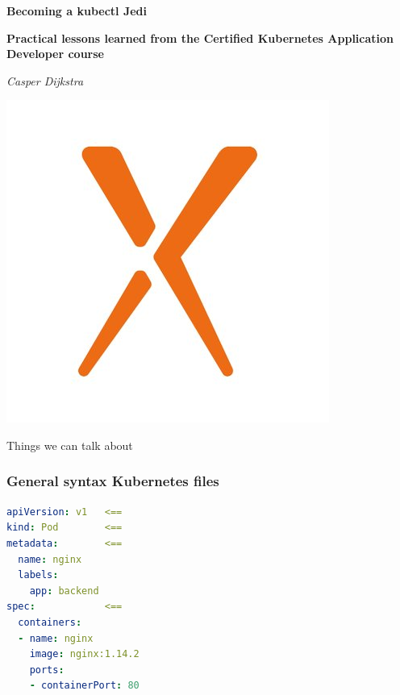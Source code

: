 \documentclass{beamer}
\begin{document}
\begin{frame}

{\huge\bfseries Becoming a kubectl Jedi \par}
	\vspace{1cm}
	{\Large\bfseries Practical lessons learned from the Certified Kubernetes Application Developer course \par}
	
	\vspace{1cm}
	{\Large\itshape Casper Dijkstra\par}
		\centering
	\includegraphics[scale=0.2]{Xpirit.jpg}\par\vspace{1cm}

	\vfill

\end{frame}

\begin{frame}{Things we can talk about}
\tableofcontents
\end{frame}

\begin{frame}[fragile]\frametitle{General syntax Kubernetes files}
\begin{lstlisting}[language=YAML]
apiVersion: v1   <==
kind: Pod        <==
metadata:        <==
  name: nginx
  labels:
    app: backend
spec:            <==
  containers:
  - name: nginx
    image: nginx:1.14.2
    ports:
    - containerPort: 80
\end{lstlisting}

\end{frame}
\end{document}
